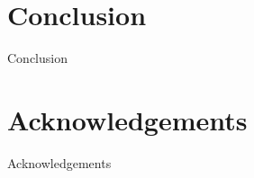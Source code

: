 \documentclass[twocolumn,twoside]{article}
\begin{document}
%
%
%
%
%
%
%

\section*{Conclusion}
Conclusion

\section*{Acknowledgements}
Acknowledgements
\end{document}
